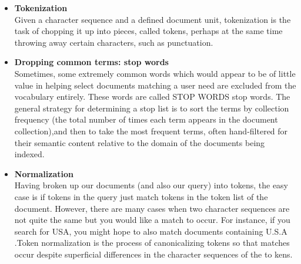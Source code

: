 \begin{itemize}
     \item \textbf{Tokenization}\\
     Given a character sequence and a defined document unit, tokenization is the
     task of chopping it up into pieces, called tokens, perhaps at the same time
     throwing away certain characters, such as punctuation.
     
     
     \item \textbf{Dropping common terms: stop words}\\
     Sometimes, some extremely common words which would appear to be of
     little value in helping select documents matching a user need are excluded
     from the vocabulary entirely. These words are called STOP WORDS stop words. The general strategy for determining a stop list is to sort the terms by collection frequency (the total number of times each term appears in the document collection),and then to take the most frequent terms, often hand-filtered for their semantic content relative to the domain of the documents being indexed.
     
     
     \item  \textbf{Normalization}\\
     Having broken up our documents (and also our query) into tokens, the easy
     case is if tokens in the query just match tokens in the token list of the document.
     However, there are many cases when two character sequences are not quite the same but you would like a match to occur. For instance, if you search for USA, you might hope to also match documents containing U.S.A .Token normalization is the process of canonicalizing tokens so that matches occur despite superficial differences in the character sequences of the to kens.
      
      
\end{itemize} 
 
 


